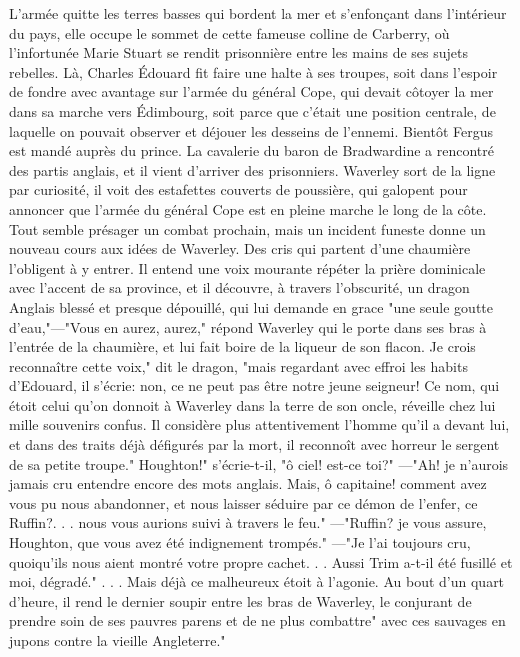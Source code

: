 L'armée quitte les terres basses qui bordent\setcounter{page}{236} la mer et s'enfonçant dans l'intérieur du pays, elle occupe le sommet de cette fameuse colline de Carberry, où l'infortunée Marie Stuart se rendit prisonnière entre les mains de ses sujets rebelles. Là, Charles Édouard fit faire une halte à ses troupes, soit dans l'espoir de fondre avec avantage sur l'armée du général Cope, qui devait côtoyer la mer dans sa marche vers Édimbourg, soit parce que c'était une position centrale, de laquelle on pouvait observer et déjouer les desseins de l'ennemi. Bientôt Fergus est mandé auprès du prince. La cavalerie du baron de Bradwardine a rencontré des partis anglais, et il vient d'arriver des prisonniers. Waverley sort de la ligne par curiosité, il voit des estafettes couverts de poussière, qui galopent pour annoncer que l'armée du général Cope est en pleine marche le long de la côte. Tout semble présager un combat prochain, mais un incident funeste donne un nouveau cours aux idées de Waverley. Des cris qui partent d'une chaumière l'obligent à y entrer. Il entend une voix mourante répéter la prière dominicale avec l'accent de sa province, et il découvre, à travers l'obscurité, un dragon Anglais blessé et presque dépouillé, qui lui demande en grace "une seule goutte d'eau,"—"Vous en aurez,\setcounter{page}{237} aurez," répond Waverley qui le porte dans ses bras à l’entrée de la chaumière, et lui fait boire de la liqueur de son flacon. Je crois reconnaître cette voix," dit le dragon, "mais regardant avec effroi les habits d’Edouard, il s’écrie: non, ce ne peut pas être notre jeune seigneur!
Ce nom, qui étoit celui qu’on donnoit à Waverley dans la terre de son oncle, réveille chez lui mille souvenirs confus. Il considère plus attentivement l’homme qu’il a devant lui, et dans des traits déjà défigurés par la mort, il reconnoît avec horreur le sergent de sa petite troupe." Houghton!" s’écrie-t-il, "ô ciel! est-ce toi?" —"Ah! je n’aurois jamais cru entendre encore des mots anglais. Mais, ô capitaine! comment avez vous pu nous abandonner, et nous laisser séduire par ce démon de l’enfer, ce Ruffin?. . . nous vous aurions suivi à travers le feu." —"Ruffin? je vous assure, Houghton, que vous avez été indignement trompés." —"Je l’ai toujours cru, quoiqu’ils nous aient montré votre propre cachet. . . Aussi Trim a-t-il été fusillé et moi, dégradé." . . . Mais déjà ce malheureux étoit à l’agonie. Au bout d’un quart d’heure, il rend le dernier soupir entre les bras de Waverley, le conjurant de prendre\setcounter{page}{238} soin de ses pauvres parens et de ne plus combattre" avec ces sauvages en jupons contre la vieille Angleterre."
